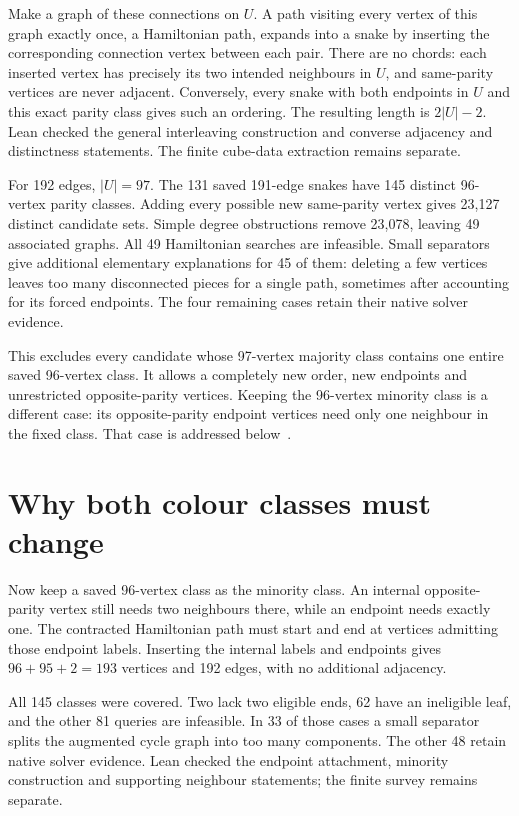 \documentclass[11pt,a4paper]{article}
\begin{document}
Make a graph of these connections on $U$. A path visiting every vertex
of this graph exactly once, a Hamiltonian path, expands into a snake by
inserting the corresponding connection vertex between each pair.
There are no chords: each inserted vertex has precisely its two intended
neighbours in $U$, and same-parity vertices are never adjacent.
Conversely, every snake with both endpoints in $U$ and this exact parity
class gives such an ordering. The resulting length is $2|U|-2$.
Lean checked the general interleaving construction and converse adjacency
and distinctness statements. The finite cube-data extraction remains separate.

For 192 edges, $|U|=97$. The 131 saved 191-edge snakes have 145 distinct
96-vertex parity classes. Adding every possible new same-parity vertex
gives 23,127 distinct candidate sets. Simple degree obstructions remove
23,078, leaving 49 associated graphs. All 49 Hamiltonian searches are
infeasible. Small separators give additional elementary explanations for
45 of them: deleting a few vertices leaves too many disconnected pieces
for a single path, sometimes after accounting for its forced endpoints.
The four remaining cases retain their native solver evidence.

This excludes every candidate whose 97-vertex majority class contains
one entire saved 96-vertex class. It allows a completely new order,
new endpoints and unrestricted opposite-parity vertices. Keeping the
96-vertex minority class is a different case: its opposite-parity
endpoint vertices need only one neighbour in the fixed class. That case
is addressed below~\cite{research231}.

\section{Why both colour classes must change}
Now keep a saved 96-vertex class as the minority class. An internal
opposite-parity vertex still needs two neighbours there, while an
endpoint needs exactly one. The contracted Hamiltonian path must start
and end at vertices admitting those endpoint labels. Inserting the
internal labels and endpoints gives $96+95+2=193$ vertices and 192 edges,
with no additional adjacency.

All 145 classes were covered. Two lack two eligible ends, 62 have an
ineligible leaf, and the other 81 queries are infeasible. In 33 of those
cases a small separator splits the augmented cycle graph into too many
components. The other 48 retain native solver evidence. Lean checked
the endpoint attachment, minority construction and supporting neighbour
statements; the finite survey remains separate.
\end{document}
